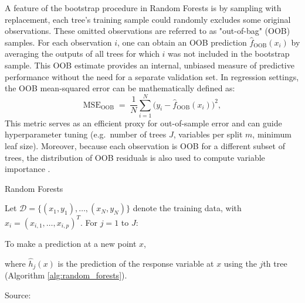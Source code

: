 A feature of the bootstrap procedure in Random Forests is by sampling with replacement, each tree's training sample could randomly excludes some original observations. These omitted observations are referred to as "out-of-bag" (OOB) samples. For each observation \(i\), one can obtain an OOB prediction \(\hat f_{\mathrm{OOB}}(x_i)\) by averaging the outputs of all trees for which \(i\) was not included in the bootstrap sample. This OOB estimate provides an internal, unbiased measure of predictive performance without the need for a separate validation set. In regression settings, the OOB mean-squared error can be mathematically defined as:
\begin{equation}
\mathrm{MSE}_{\mathrm{OOB}} \;=\; \frac{1}{N}\sum_{i=1}^N\bigl(y_i - \hat f_{\mathrm{OOB}}(x_i)\bigr)^2,
\end{equation}
This metric serves as an efficient proxy for out-of-sample error and can guide hyperparameter tuning (e.g.\ number of trees \(J\), variables per split \(m\), minimum leaf size). Moreover, because each observation is OOB for a different subset of trees, the distribution of OOB residuals is also used to compute variable importance \cite{breiman2001,cutler_2012}. 


\begin{algorithm}[H]
    \caption{Random Forests}
    \label{alg:random_forests}
    
    Let $\mathcal{D} = \{(x_1, y_1), \ldots, (x_N, y_N)\}$ denote the training data, with $x_i = (x_{i,1}, \ldots, x_{i,p})^T$. For $j = 1$ to $J$:
    
    
    To make a prediction at a new point $x$,
    
    where $\widehat{h}_j(x)$ is the prediction of the response variable at $x$ using the $j$th tree (Algorithm \ref{alg:random_forests}).

    Source: \cite{cutler_2012}
\end{algorithm}

